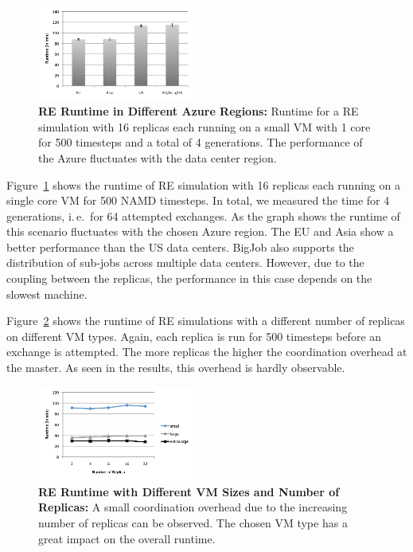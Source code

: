 \documentclass[conference,final]{IEEEtran}
\begin{document}
\begin{figure}[htbp]
    \centering
        \includegraphics[width=0.46\textwidth]{performance/repex_runtime_per_region.pdf}
    \caption{\textbf{RE Runtime in Different Azure Regions:} Runtime for a RE simulation with 
    16 replicas each running on a small VM with 1 core for 500 timesteps and a total of 4 generations. The performance of
    the Azure fluctuates with the data center region. }
    \label{fig:performance_repex_runtime_per_region}
\end{figure}

Figure~\ref{fig:performance_repex_runtime_per_region} shows the runtime of RE simulation
with 16 replicas each running on a single core VM for 500 NAMD timesteps. In total, we measured
the time for 4 generations, i.\,e.\ for 64 attempted exchanges. As the graph shows the runtime
of this scenario fluctuates with the chosen Azure region. The EU and Asia show a better performance
than the US data centers. BigJob also supports the distribution of sub-jobs across multiple data 
centers. However, due to the coupling between the replicas, the performance in this case
depends on the slowest machine.

Figure~\ref{fig:performance_repex_scaleout_vmsizes} shows the runtime of RE simulations
with a different number of replicas on different VM types. Again, each replica
is run for 500 timesteps before an exchange is attempted. The more replicas the higher the 
coordination overhead at the master. As seen in the results, this overhead is hardly 
observable.
\begin{figure}[ht]
    \centering
        \includegraphics[width=0.46\textwidth]{performance/repex_scaleout_vmsizes.pdf}
    \caption{\textbf{RE Runtime with Different VM Sizes and Number of Replicas:} A small
    coordination overhead due to the increasing number of replicas can be observed. 
    The chosen VM type has a great impact on the overall runtime.}
    \label{fig:performance_repex_scaleout_vmsizes}
\end{figure}
\end{document}
